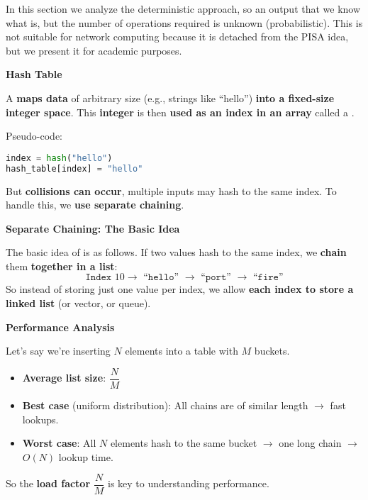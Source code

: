 In this section we analyze the deterministic approach, so an output that we know what is, but the number of operations required is unknown (probabilistic). This is not suitable for network computing because it is detached from the PISA idea, but we present it for academic purposes.

\highspace
\begin{flushleft}
    \textcolor{Green3}{ \textbf{Hash Table}}
\end{flushleft}
A  \textbf{maps data} of arbitrary size (e.g., strings like ``hello'') \textbf{into a fixed-size integer space}. This \textbf{integer} is then \textbf{used as an index in an array} called a .

\highspace
Pseudo-code:
\begin{lstlisting}[language=python]
index = hash("hello")
hash_table[index] = "hello"
\end{lstlisting}
But \textbf{collisions can occur}, multiple inputs may hash to the same index. To handle this, we \textbf{use separate chaining}.

\highspace
\begin{flushleft}
    \textcolor{Green3}{ \textbf{Separate Chaining: The Basic Idea}}
\end{flushleft}
The basic idea of  is as follows. If two values hash to the same index, we \textbf{chain} them \textbf{together in a list}:
\begin{equation*}
    \texttt{Index }10 \rightarrow \texttt{ ``hello'' } \rightarrow \texttt{ ``port'' } \rightarrow \texttt{ ``fire''}
\end{equation*}
So instead of storing just one value per index, we allow \textbf{each index to store a linked list} (or vector, or queue).

\highspace
\begin{flushleft}
    \textcolor{Green3}{\faIcon{\speedIcon} \textbf{Performance Analysis}}
\end{flushleft}
Let's say we're inserting $N$ elements into a table with $M$ buckets.
\begin{itemize}
    \item \textbf{Average list size}: $\dfrac{N}{M}$
    \item \textcolor{Green3}{\textbf{Best case}} (uniform distribution): All chains are of similar length $\rightarrow$ fast lookups.
    \item \textcolor{Red2}{\textbf{Worst case}}: All $N$ elements hash to the same bucket $\rightarrow$ one long chain $\rightarrow$ $O\left(N\right)$ lookup time.
\end{itemize}
So the \textbf{load factor} $\dfrac{N}{M}$ is key to understanding performance.

